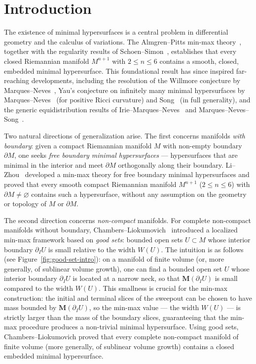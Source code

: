 \chapter{Introduction}
\label{ch:intro}

The existence of minimal hypersurfaces is a central problem in differential geometry and the calculus of variations. The Almgren--Pitts min-max theory~\cite{Alm65, Pit81}, together with the regularity results of Schoen--Simon~\cite{SS81}, establishes that every closed Riemannian manifold $M^{n+1}$ with $2 \leq n \leq 6$ contains a smooth, closed, embedded minimal hypersurface. This foundational result has since inspired far-reaching developments, including the resolution of the Willmore conjecture by Marques--Neves~\cite{MN14}, Yau's conjecture on infinitely many minimal hypersurfaces by Marques--Neves~\cite{MN17} (for positive Ricci curvature) and Song~\cite{Song18} (in full generality), and the generic equidistribution results of Irie--Marques--Neves~\cite{IMN17} and Marques--Neves--Song~\cite{MNS}.

Two natural directions of generalization arise. The first concerns manifolds \emph{with boundary}: given a compact Riemannian manifold $M$ with non-empty boundary $\partial M$, one seeks \emph{free boundary minimal hypersurfaces} --- hypersurfaces that are minimal in the interior and meet $\partial M$ orthogonally along their boundary. Li--Zhou~\cite{LZ17} developed a min-max theory for free boundary minimal hypersurfaces and proved that every smooth compact Riemannian manifold $M^{n+1}$ ($2 \leq n \leq 6$) with $\partial M \neq \varnothing$ contains such a hypersurface, without any assumption on the geometry or topology of $M$ or $\partial M$.

The second direction concerns \emph{non-compact} manifolds. For complete non-compact manifolds without boundary, Chambers--Liokumovich~\cite{CL20} introduced a localized min-max framework based on \emph{good sets}: bounded open sets $U \subset M$ whose interior boundary $\partial_I U$ is small relative to the width $W(U)$. The intuition is as follows (see Figure~\ref{fig:good-set-intro}): on a manifold of finite volume (or, more generally, of sublinear volume growth), one can find a bounded open set $U$ whose interior boundary $\partial_I U$ is located at a narrow neck, so that $\mathbf{M}(\partial_I U)$ is small compared to the width $W(U)$. This smallness is crucial for the min-max construction: the initial and terminal slices of the sweepout can be chosen to have mass bounded by $\mathbf{M}(\partial_I U)$, so the min-max value --- the width $W(U)$ --- is strictly larger than the mass of the boundary slices, guaranteeing that the min-max procedure produces a non-trivial minimal hypersurface. Using good sets, Chambers--Liokumovich proved that every complete non-compact manifold of finite volume (more generally, of sublinear volume growth) contains a closed embedded minimal hypersurface.

